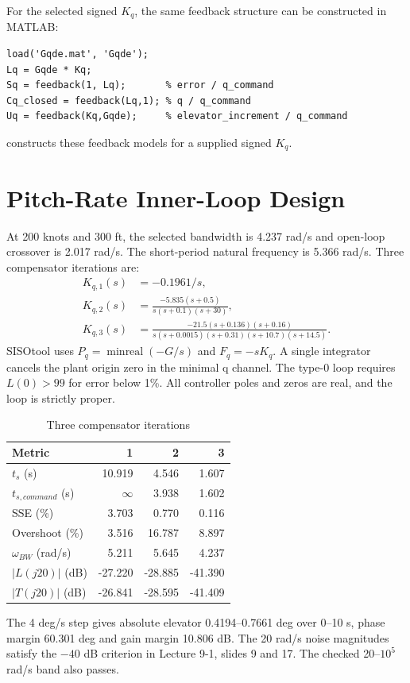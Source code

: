 \documentclass[a4paper,11pt]{article}
\newcommand{\file}[1]{\mbox{\texttt{\small\detokenize{#1}}}}
\begin{document}
For the selected signed $K_q$, the same feedback structure can be constructed in MATLAB:
\begin{lstlisting}
load('Gqde.mat', 'Gqde');
Lq = Gqde * Kq;
Sq = feedback(1, Lq);       % error / q_command
Cq_closed = feedback(Lq,1); % q / q_command
Uq = feedback(Kq,Gqde);     % elevator_increment / q_command
\end{lstlisting}
\file{loop.m} constructs these feedback models for a supplied signed $K_q$.

\clearpage\section{Pitch-Rate Inner-Loop Design}
At 200 knots and 300 ft, the selected bandwidth is 4.237 rad/s and open-loop crossover is 2.017 rad/s. The short-period natural frequency is 5.366 rad/s. Three compensator iterations are:
\begin{align}
K_{q,1}(s)&=-0.1961/s,\\
K_{q,2}(s)&=\frac{-5.835(s+0.5)}{s(s+0.1)(s+30)},\\
K_{q,3}(s)&=\frac{-21.5(s+0.136)(s+0.16)}{s(s+0.0015)(s+0.31)(s+10.7)(s+14.5)}.
\end{align}
SISOtool uses $P_q=\operatorname{minreal}(-G/s)$ and $F_q=-sK_q$. A single integrator cancels the plant origin zero in the minimal q channel. The type-0 loop requires $L(0)>99$ for error below 1\%. All controller poles and zeros are real, and the loop is strictly proper.
\begin{table}[H]\centering\small\caption{Three compensator iterations}
\begin{tabular}{lrrr}\toprule
Metric & 1 & 2 & 3\\\midrule
$t_s$ (s) & 10.919 & 4.546 & 1.607\\
$t_{s,command}$ (s) & $\infty$ & 3.938 & 1.602\\
SSE (\%) & 3.703 & 0.770 & 0.116\\
Overshoot (\%) & 3.516 & 16.787 & 8.897\\
$\omega_{BW}$ (rad/s) & 5.211 & 5.645 & 4.237\\
$|L(j20)|$ (dB) & -27.220 & -28.885 & -41.390\\
$|T(j20)|$ (dB) & -26.841 & -28.595 & -41.409\\
\bottomrule\end{tabular}\end{table}

The 4 deg/s step gives absolute elevator 0.4194--0.7661 deg over 0--10 s, phase margin 60.301 deg and gain margin 10.806 dB. The 20 rad/s noise magnitudes satisfy the $-40$ dB criterion in Lecture 9-1, slides 9 and 17. The checked 20--$10^5$ rad/s band also passes.
\end{document}
